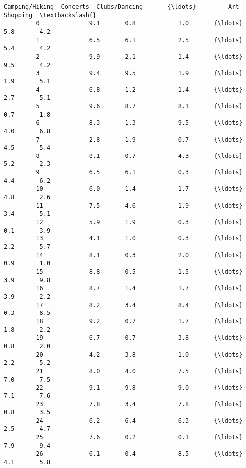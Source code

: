 \documentclass[11pt]{article}
\begin{document}
\begin{Verbatim}[commandchars=\\\{\}]
             Camping/Hiking  Concerts  Clubs/Dancing       {\ldots}         Art  Shopping  \textbackslash{}
         0              9.1       0.8            1.0       {\ldots}         5.8       4.2   
         1              6.5       6.1            2.5       {\ldots}         5.4       4.2   
         2              9.9       2.1            1.4       {\ldots}         9.5       4.2   
         3              9.4       9.5            1.9       {\ldots}         1.9       5.1   
         4              6.8       1.2            1.4       {\ldots}         2.7       5.1   
         5              9.6       8.7            8.1       {\ldots}         0.7       1.8   
         6              8.3       1.3            9.5       {\ldots}         4.0       6.8   
         7              2.8       1.9            0.7       {\ldots}         4.5       5.4   
         8              8.1       0.7            4.3       {\ldots}         5.2       2.3   
         9              6.5       6.1            0.3       {\ldots}         4.4       6.2   
         10             6.0       1.4            1.7       {\ldots}         4.8       2.6   
         11             7.5       4.6            1.9       {\ldots}         3.4       5.1   
         12             5.9       1.9            0.3       {\ldots}         0.1       3.9   
         13             4.1       1.0            0.3       {\ldots}         2.2       5.7   
         14             8.1       0.3            2.0       {\ldots}         0.9       1.0   
         15             8.8       0.5            1.5       {\ldots}         3.9       9.8   
         16             8.7       1.4            1.7       {\ldots}         3.9       2.2   
         17             8.2       3.4            8.4       {\ldots}         0.3       8.5   
         18             9.2       0.7            1.7       {\ldots}         1.8       2.2   
         19             6.7       0.7            3.8       {\ldots}         0.8       2.0   
         20             4.2       3.8            1.0       {\ldots}         2.2       5.2   
         21             8.0       4.0            7.5       {\ldots}         7.0       7.5   
         22             9.1       9.8            9.0       {\ldots}         7.1       7.6   
         23             7.8       3.4            7.8       {\ldots}         0.8       3.5   
         24             6.2       6.4            6.3       {\ldots}         2.5       4.7   
         25             7.6       0.2            0.1       {\ldots}         7.9       9.4   
         26             6.1       0.4            8.5       {\ldots}         4.1       5.8   

\end{Verbatim}
\end{document}
